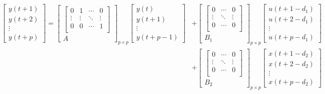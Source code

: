 \documentclass{article}
\begin{document}
\begin{align*}
\begin{split}
	\begin{bmatrix}
		y(t+1)\\
		y(t+2)\\
		\vdots\\
		y(t+p)
	\end{bmatrix}
	=
	\begin{bmatrix}
	\begin{bmatrix}
		0 & 1 & \cdots & 0\\
		\vdots & \vdots & \ddots & \vdots\\ 
		0 & 0 & \cdots & 1\\
	\end{bmatrix}  \\ 
	A
	\end{bmatrix}_{p\times p}
	\begin{bmatrix}
	y(t)\\
	y(t+1)\\
	\vdots\\
	y(t+p-1)
	\end{bmatrix}
	& +
	\begin{bmatrix}
	\begin{bmatrix}
	0 & \cdots & 0\\
	\vdots & \ddots & \vdots\\ 
	0 & \cdots & 0\\
	\end{bmatrix}\\
	B_1
	\end{bmatrix}_{p\times p}
	\begin{bmatrix}
	u(t+1-d_1)\\
	u(t+2-d_1)\\
	\vdots\\
	u(t+p-d_1)
	\end{bmatrix}\\
	& 	+
	\begin{bmatrix}
	\begin{bmatrix}
	0 & \cdots & 0\\
	\vdots & \ddots & \vdots\\ 
	0 & \cdots & 0\\
	\end{bmatrix}\\
	B_2
	\end{bmatrix}_{p\times p}
	\begin{bmatrix}
	x(t+1-d_2)\\
	x(t+2-d_2)\\
	\vdots\\
	x(t+p-d_2)
	\end{bmatrix}\\
\end{split}
\end{align*}
\end{document}
